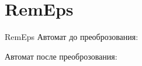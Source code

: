 \section{RemEps}
\begin{frame}{RemEps}
	Автомат до преоброзования:


	Автомат после преоброзования:


\end{frame}
